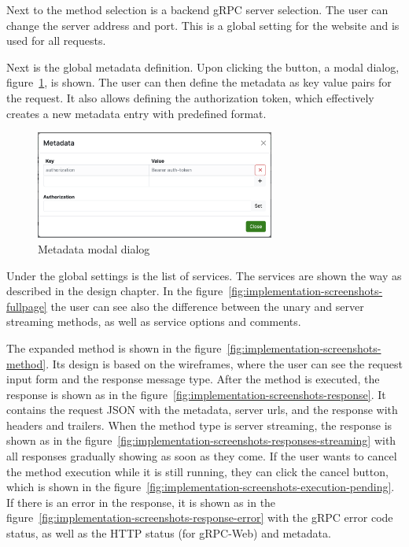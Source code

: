 Next to the method selection is a backend gRPC server selection.
The user can change the server address and port.
This is a global setting for the website and is used for all requests.

Next is the global metadata definition.
Upon clicking the button, a modal dialog, figure~\ref{fig:implementation-screenshots-metadata-modal}, is shown.
The user can then define the metadata as key value pairs for the request.
It also allows defining the authorization token, which effectively creates a new metadata entry with predefined format.

\begin{figure}[!htb]
    \centering
    \captionsetup{justification=centering}
    \includegraphics[width=0.7\textwidth]{images/implementation/screenshots/metadata-modal}
    \caption{Metadata modal dialog}
    \label{fig:implementation-screenshots-metadata-modal}
\end{figure}

Under the global settings is the list of services.
The services are shown the way as described in the design chapter.
In the figure~\ref{fig:implementation-screenshots-fullpage} the user can see also the difference between the unary and server streaming methods, as well as service options and comments.

The expanded method is shown in the figure~\ref{fig:implementation-screenshots-method}.
Its design is based on the wireframes, where the user can see the request input form and the response message type.
After the method is executed, the response is shown as in the figure~\ref{fig:implementation-screenshots-response}.
It contains the request JSON with the metadata, server urls, and the response with headers and trailers.
When the method type is server streaming, the response is shown as in the figure~\ref{fig:implementation-screenshots-responses-streaming} with all responses gradually showing as soon as they come.
If the user wants to cancel the method execution while it is still running, they can click the cancel button, which is shown in the figure~\ref{fig:implementation-screenshots-execution-pending}.
If there is an error in the response, it is shown as in the figure~\ref{fig:implementation-screenshots-response-error} with the gRPC error code status, as well as the HTTP status (for gRPC-Web) and metadata.



